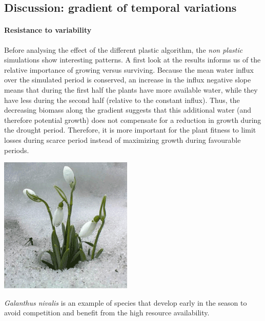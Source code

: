 




\subsection{Discussion: gradient of temporal variations}

\paragraph{Resistance to variability}

Before analysing the effect of the different plastic algorithm, the \textit{non plastic} simulations show interesting patterns. A first look at the results informs us of the relative importance of growing versus surviving. Because the mean water influx over the simulated period is conserved, an increase in the influx negative slope means that during the first half the plants have more available water, while they have less during the second half (relative to the constant influx). Thus, the decreasing biomass along the gradient suggests that this additional water (and therefore potential growth) does not compensate for a reduction in growth during the drought period. Therefore, it is more important for the plant fitness to limit losses during scarce period instead of maximizing growth during favourable periods. 

\begin{marginfigure}
\includegraphics[scale=1]{./2_PP/Figures/Variable/GalanthusNivalis.png}
\caption[\textit{Galanthus nivalis}]{\textit{Galanthus nivalis} is an example of species that develop early in the season to avoid competition and benefit from the high resource availability.}\label{fig:galanthus}
\end{marginfigure}

